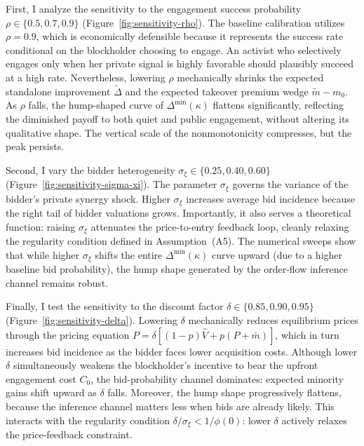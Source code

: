 \documentclass[11pt]{article}
\newcommand{\1}{\mathbf{1}}
\begin{document}
First, I analyze the sensitivity to the engagement success probability $\rho \in \{0.5, 0.7, 0.9\}$ (Figure~\ref{fig:sensitivity-rho}). The baseline calibration utilizes $\rho = 0.9$, which is economically defensible because it represents the success rate conditional on the blockholder choosing to engage. An activist who selectively engages only when her private signal is highly favorable should plausibly succeed at a high rate. Nevertheless, lowering $\rho$ mechanically shrinks the expected standalone improvement $\tilde{\Delta}$ and the expected takeover premium wedge $\tilde{m} - m_0$. As $\rho$ falls, the hump-shaped curve of $\Delta^{\min}(\kappa)$ flattens significantly, reflecting the diminished payoff to both quiet and public engagement, without altering its qualitative shape. The vertical scale of the nonmonotonicity compresses, but the peak persists.

Second, I vary the bidder heterogeneity $\sigma_\xi \in \{0.25, 0.40, 0.60\}$ (Figure~\ref{fig:sensitivity-sigma-xi}). The parameter $\sigma_\xi$ governs the variance of the bidder's private synergy shock. Higher $\sigma_\xi$ increases average bid incidence because the right tail of bidder valuations grows. Importantly, it also serves a theoretical function: raising $\sigma_\xi$ attenuates the price-to-entry feedback loop, cleanly relaxing the regularity condition defined in Assumption~\textup{(A5)}. The numerical sweeps show that while higher $\sigma_\xi$ shifts the entire $\Delta^{\min}(\kappa)$ curve upward (due to a higher baseline bid probability), the hump shape generated by the order-flow inference channel remains robust.

Finally, I test the sensitivity to the discount factor $\delta \in \{0.85, 0.90, 0.95\}$ (Figure~\ref{fig:sensitivity-delta}). Lowering $\delta$ mechanically reduces equilibrium prices through the pricing equation $P = \delta[(1-p)\hat{V} + p(P + \bar{m})]$, which in turn increases bid incidence as the bidder faces lower acquisition costs. Although lower $\delta$ simultaneously weakens the blockholder's incentive to bear the upfront engagement cost $C_0$, the bid-probability channel dominates: expected minority gains shift upward as $\delta$ falls. Moreover, the hump shape progressively flattens, because the inference channel matters less when bids are already likely. This interacts with the regularity condition $\delta/\sigma_\xi < 1/\phi(0)$: lower $\delta$ actively relaxes the price-feedback constraint.

\end{document}
